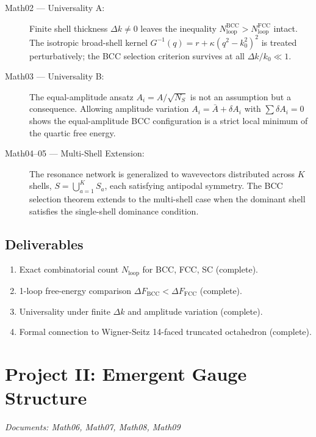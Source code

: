 \documentclass[reprint,aps,pre,onecolumn,superscriptaddress,amsmath,amssymb]{revtex4-2}
\newcommand{\Nloop}{N_{\mathrm{loop}}}
\begin{document}
\begin{description}
  \item[Math02 --- Universality A:]
    Finite shell thickness $\Delta k \neq 0$ leaves the inequality
    $\Nloop^{\mathrm{BCC}} > \Nloop^{\mathrm{FCC}}$ intact.
    The isotropic broad-shell kernel $G^{-1}(q) = r + \kappa(q^{2}-k_{0}^{2})^{2}$
    is treated perturbatively; the BCC selection criterion survives at all
    $\Delta k / k_{0} \ll 1$.

  \item[Math03 --- Universality B:]
    The equal-amplitude ansatz $A_{i} = A/\sqrt{N_{S}}$ is not an assumption
    but a consequence. Allowing amplitude variation
    $A_{i} = \bar{A} + \delta A_{i}$ with $\sum\delta A_{i} = 0$ shows the
    equal-amplitude BCC configuration is a strict local minimum of the
    quartic free energy.

  \item[Math04--05 --- Multi-Shell Extension:]
    The resonance network is generalized to wavevectors distributed across
    $K$ shells, $S = \bigcup_{a=1}^{K} S_{a}$, each satisfying antipodal
    symmetry. The BCC selection theorem extends to the multi-shell case
    when the dominant shell satisfies the single-shell dominance condition.
\end{description}

\subsection{Deliverables}
\begin{enumerate}
  \item Exact combinatorial count $\Nloop$ for BCC, FCC, SC (complete).
  \item 1-loop free-energy comparison $\Delta F_{\mathrm{BCC}} < \Delta F_{\mathrm{FCC}}$ (complete).
  \item Universality under finite $\Delta k$ and amplitude variation (complete).
  \item Formal connection to Wigner-Seitz 14-faced truncated octahedron (complete).
\end{enumerate}

\section{Project II: Emergent Gauge Structure}
\label{sec:proj2}
\textit{Documents: Math06, Math07, Math08, Math09}
\end{document}
